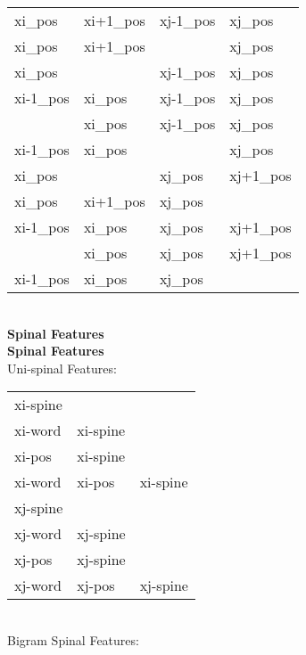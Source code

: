 \documentclass[11pt]{article}
\begin{document}
\begin{tabular}{|l l l l |}
	\hline
		xi\_pos& xi+1\_pos & xj-1\_pos & xj\_pos \\
		xi\_pos& xi+1\_pos &           & xj\_pos \\
		xi\_pos&           & xj-1\_pos & xj\_pos \\
		xi-1\_pos& xi\_pos & xj-1\_pos & xj\_pos \\
		         & xi\_pos & xj-1\_pos & xj\_pos \\
		xi-1\_pos& xi\_pos &           & xj\_pos \\
		xi\_pos&           & xj\_pos & xj+1\_pos \\
		xi\_pos& xi+1\_pos & xj\_pos &           \\
		xi-1\_pos& xi\_pos & xj\_pos & xj+1\_pos \\
		         & xi\_pos & xj\_pos & xj+1\_pos \\
		xi-1\_pos& xi\_pos & xj\_pos &           \\
	\hline
\end{tabular} \\
            
            
            
\vspace{1cm}            
\textbf{Spinal Features} \\
 
       
\textbf{Spinal Features} \\
 
       
Uni-spinal Features: \\

\begin{tabular}{|l l l|}
	\hline
    	xi-spine&&\\
		xi-word& xi-spine& \\
		xi-pos& xi-spine& \\
        xi-word& xi-pos& xi-spine \\
    	xj-spine&&\\
		xj-word& xj-spine& \\
		xj-pos& xj-spine& \\
        xj-word& xj-pos& xj-spine \\
	\hline
\end{tabular} \\


Bigram Spinal Features:  \\
\end{document}
